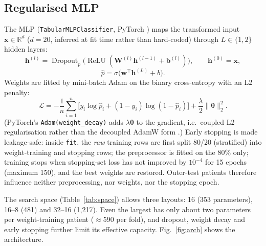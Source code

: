 \documentclass[conference]{IEEEtran}
\newcommand{\code}[1]{\texttt{\small #1}}
\begin{document}
\subsection{Regularised MLP}
The MLP (\code{TabularMLPClassifier}, PyTorch \cite{pytorch}) maps the transformed input $\mathbf{x}\in\mathbb{R}^{d}$ ($d=20$, inferred at fit time rather than hard-coded) through $L\in\{1,2\}$ hidden layers:
\begin{equation}
\mathbf{h}^{(l)} = \operatorname{Dropout}_p\!\big(\operatorname{ReLU}(\mathbf{W}^{(l)}\mathbf{h}^{(l-1)} + \mathbf{b}^{(l)})\big),\qquad \mathbf{h}^{(0)}=\mathbf{x},
\end{equation}
\begin{equation}
\hat{p} = \sigma\big(\mathbf{w}^{\top}\mathbf{h}^{(L)} + b\big).
\end{equation}
Weights are fitted by mini-batch Adam \cite{adam} on the binary cross-entropy with an L2 penalty:
\begin{equation}
\mathcal{L} = -\frac{1}{n}\sum_{i=1}^{n}\big[y_i\log\hat{p}_i + (1-y_i)\log(1-\hat{p}_i)\big] + \frac{\lambda}{2}\lVert\boldsymbol\theta\rVert_2^2 .
\end{equation}
(PyTorch's \code{Adam(weight\_decay)} adds $\lambda\boldsymbol\theta$ to the gradient, i.e.\ coupled L2 regularisation rather than the decoupled AdamW form \cite{adamw}.) Early stopping \cite{prechelt} is made leakage-safe: inside \code{fit}, the \emph{raw} training rows are first split 80/20 (stratified) into weight-training and stopping rows; the preprocessor is fitted on the 80\% only; training stops when stopping-set loss has not improved by $10^{-4}$ for 15 epochs (maximum 150), and the best weights are restored. Outer-test patients therefore influence neither preprocessing, nor weights, nor the stopping epoch.

The search space (Table~\ref{tab:space}) allows three layouts: 16 (353 parameters), 16--8 (481) and 32--16 (1{,}217). Even the largest has only about two parameters per weight-training patient ($\approx$590 per fold), and dropout, weight decay and early stopping further limit its effective capacity. Fig.~\ref{fig:arch} shows the architecture.
\end{document}
